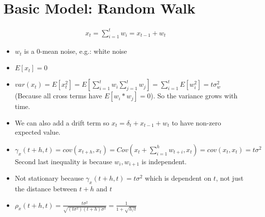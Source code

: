 \section{Basic Model: Random Walk}
\begin{align*}
    x_t = \sum_{i=1}^t w_i = x_{t-1} + w_t
\end{align*}
\begin{itemize}
    \item $w_t$ is a 0-mean noise, e.g.: white noise
    \item $E[x_t] = 0$
    \item $var(x_t) = E[x_t^2] = E[\sum_{i=1}^t w_i \sum_{j=1}^t w_j] =\sum_{i=1}^t E[w_i^2] = t \sigma_w^2$ (Because all cross terms have $E[w_i * w_j]=0$). So the variance grows with time. 
    \item We can also add a drift term so $x_t = \delta_t + x_{t-1} + w_t$ to have non-zero expected value. 
    \item $\gamma_x(t+h, t) = cov(x_{t+h}, x_t) = Cov(x_t + \sum_{i=1}^{h} w_{t+i}, x_t) = cov(x_t, x_t) = t\sigma^2$ Second last inequality is because $w_i, w_{i+1}$ is independent. 
    \item Not stationary because $\gamma_x(t+h, t) = t\sigma^2$ which is dependent on $t$, not just the distance between $t+h$ and $t$
    \item $\rho_x(t+h, t) = \frac{t\sigma^2}{\sqrt{(t\sigma^2)(t+h)\sigma^2}} = \frac{1}{1 + \sqrt{h/t}}$
\end{itemize}


    
    
    

